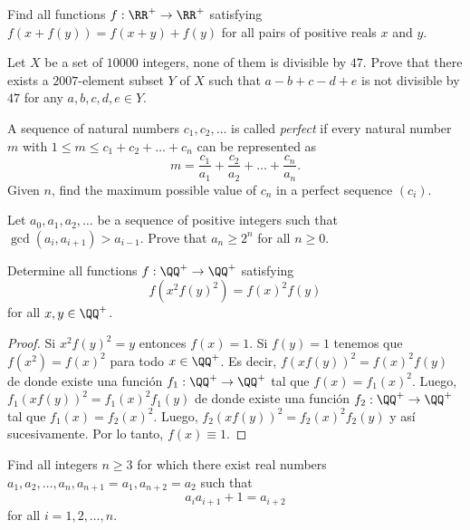 \begin{probMR}
	Find all functions $f:\RR^+\to\RR^+$ satisfying $f(x+f(y))=f(x+y)+f(y)$ for all pairs of positive reals $x$ and $y$.
\end{probMR}

\begin{probMR}
	Let $X$ be a set of $10000$ integers, none of them is divisible by $47$. Prove that there exists a $2007$-element subset $Y$ of $X$ such that $a-b+c-d+e$ is not divisible by $47$ for any $a,b,c,d,e\in Y$.
\end{probMR}

\begin{probEG}
	A sequence of natural numbers $c_1,c_2,\dots$ is called \emph{perfect} if every natural number $m$ with $1\le m\le c_1+c_2+\dots+c_n$ can be represented as
	\[m=\frac{c_1}{a_1}+\frac{c_2}{a_2}+\dots+\frac{c_n}{a_n}.\]
	Given $n$, find the maximum possible value of $c_n$ in a perfect sequence $(c_i)$.
\end{probEG}

\begin{probMR}
	Let $a_0,a_1,a_2,\dots$ be a sequence of positive integers such that $\gcd(a_i,a_{i+1})>a_{i-1}$. Prove that $a_n\ge 2^n$ for all $n\ge 0$.
\end{probMR}

\begin{probEG}
	Determine all functions $f:\QQ^+\to\QQ^+$ satisfying
	\[f(x^2f(y)^2)=f(x)^2f(y)\]
	for all $x,y\in\QQ^+$.
\end{probEG}

\begin{proof}
	Si $x^2f(y)^2=y$ entonces $f(x)=1$. Si $f(y)=1$ tenemos que $f(x^2)=f(x)^2$ para todo $x\in\QQ^+$. Es decir, $f(xf(y))^2=f(x)^2f(y)$ de donde existe una función $f_1:\QQ^+\to\QQ^+$ tal que $f(x)=f_1(x)^2$. Luego, $f_1(xf(y))^2=f_1(x)^2f_1(y)$ de donde existe una función $f_2:\QQ^+\to\QQ^+$ tal que $f_1(x)=f_2(x)^2$. Luego, $f_2(xf(y))^2=f_2(x)^2f_2(y)$ y así sucesivamente. Por lo tanto, $f(x)\equiv 1$.
\end{proof}

\begin{probMR}
	Find all integers $n\ge 3$ for which there exist real numbers $a_1,a_2,\dots,a_n,a_{n+1}=a_1,a_{n+2}=a_2$ such that
	\[a_ia_{i+1}+1=a_{i+2}\]
	for all $i=1,2,\dots,n$.
\end{probMR}

